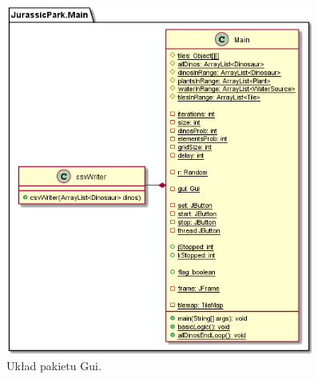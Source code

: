 \begin{figure}[h!]
    \centering
    \begin{minipage}{0.45\textwidth}
        \centering
        \includegraphics[width=0.9\textwidth]{images/class/main.png} %
        \caption{Układ pakietu Gui.}
    \end{minipage}\hfill
    \begin{minipage}{0.45\textwidth}
        \centering

\end{minipage}
\end{figure}
